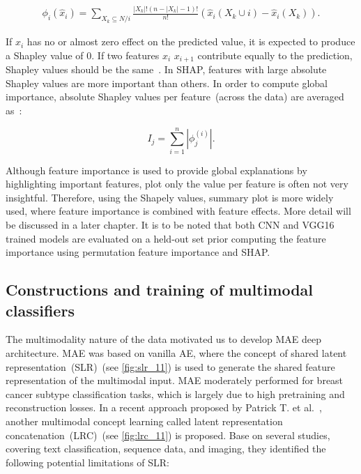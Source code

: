 \vspace{-2mm}
\begin{align}
    \phi_{i}(\hat x_i)=\sum_{X_k \subseteq N / i} \frac{|X_k| !(n-|X_k|-1) !}{n !}(\hat x_i(X_k \cup i)-\hat x_i(X_k)).
    \label{eq:shap}
\end{align}

\hspace*{3.5mm} If $x_i$ has no or almost zero effect on the predicted value, it is expected to produce a Shapley value of 0. If two features $x_i$ $x_{i+1}$ contribute equally to the prediction, Shapley values should be the same~\cite{NIPS2017_7062}. In SHAP, features with large absolute Shapley values are more important than others. In order to compute global importance, absolute Shapley values per feature~(across the data) are averaged as~\cite{NIPS2017_7062}:

\begin{equation}
    I_{j}=\sum_{i=1}^{n}\left|\phi_{j}^{(i)}\right|.
\end{equation}

\hspace*{3.5mm} Although feature importance is used to provide global explanations by highlighting important features, plot only the value per feature is often not very insightful. Therefore, using the Shapely values, summary plot is more widely used, where feature importance is combined with feature effects. More detail will be discussed in a later chapter. It is to be noted that both CNN and VGG16 trained models are evaluated on a held-out set prior computing the feature importance using permutation feature importance and SHAP.

\subsection{Constructions and training of multimodal classifiers}
The multimodality nature of the data motivated us to develop MAE deep architecture. MAE was based on vanilla AE, where the concept of shared latent representation~(SLR)~(see \cref{fig:slr_11}) is used to generate the shared feature representation of the multimodal input. MAE moderately performed for breast cancer subtype classification tasks, which is largely due to high pretraining and reconstruction losses.
In a recent approach proposed by Patrick T. et al.~\cite{mmdcae}, another multimodal concept learning called latent representation concatenation~(LRC)~(see \cref{fig:lrc_11}) is proposed. Base on several studies, covering text classification, sequence data, and imaging, they identified the following potential limitations of SLR: 

